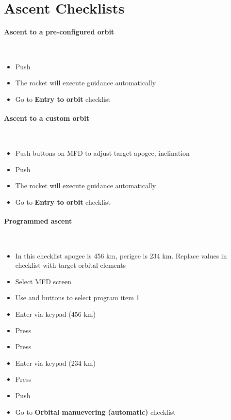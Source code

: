 \twocolumn
\singlespacing


\renewcommand{\labelitemi}{$\Box$}

\section{Ascent Checklists}
\paragraph{Ascent to a pre-configured orbit}~
\begin{itemize}
	\item Push 
	\item The rocket will execute guidance automatically
	\item Go to \textbf{Entry to orbit} checklist
\end{itemize}

\paragraph{Ascent to a custom orbit}~
\begin{itemize}
  \item Push buttons on MFD to adjust target apogee, inclination
	\item Push 
	\item The rocket will execute guidance automatically
	\item Go to \textbf{Entry to orbit} checklist
\end{itemize}

\paragraph{Programmed ascent}~
\begin{itemize}
  \item In this checklist apogee is 456 km, perigee is 234 km. Replace values in checklist with target orbital elements
  \item Select  MFD screen
  \item Use \reg{+} and \reg{-} buttons to select program item 1
  \item Enter via keypad  (456 km)
  \item Press 
  \item Press \reg{+}
  \item Enter via keypad  (234 km)
  \item Press 
  \item Push 
  \item Go to \textbf{Orbital manuevering (automatic)} checklist
\end{itemize}



